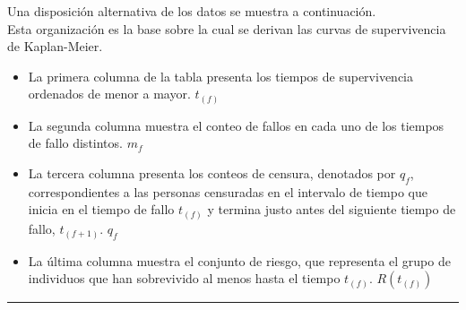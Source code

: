 \documentclass[
]{article}
\providecommand{\tightlist}{%
  \setlength{\itemsep}{0pt}\setlength{\parskip}{0pt}}
\begin{document}
\begin{tcolorbox}[enhanced jigsaw, arc=.35mm, coltitle=black, opacitybacktitle=0.6, colbacktitle=quarto-callout-note-color!10!white, breakable, toprule=.15mm, titlerule=0mm, colframe=quarto-callout-note-color-frame, colback=white, bottomrule=.15mm, leftrule=.75mm, rightrule=.15mm, bottomtitle=1mm, toptitle=1mm, opacityback=0, left=2mm, title=\textcolor{quarto-callout-note-color}{\faInfo}\hspace{0.5em}{Disposición alternativa de los datos ordenados}]

Una disposición alternativa de los datos se muestra a continuación.\\
Esta organización es la base sobre la cual se derivan las curvas de
supervivencia de Kaplan-Meier.

\begin{itemize}
\tightlist
\item
  La primera columna de la tabla presenta los tiempos de supervivencia
  ordenados de menor a mayor. \(t_{(f)}\)
\item
  La segunda columna muestra el conteo de fallos en cada uno de los
  tiempos de fallo distintos. \(m_{f}\)
\item
  La tercera columna presenta los conteos de censura, denotados por
  \(q_f\), correspondientes a las personas censuradas en el intervalo de
  tiempo que inicia en el tiempo de fallo \(t_{(f)}\) y termina justo
  antes del siguiente tiempo de fallo, \(t_{(f+1)}\). \(q_{f}\)
\item
  La última columna muestra el conjunto de riesgo, que representa el
  grupo de individuos que han sobrevivido al menos hasta el tiempo
  \(t_{(f)}\). \(R(t_{(f)})\)
\end{itemize}

\end{tcolorbox}

\begin{center}\rule{0.5\linewidth}{0.5pt}\end{center}
\end{document}

